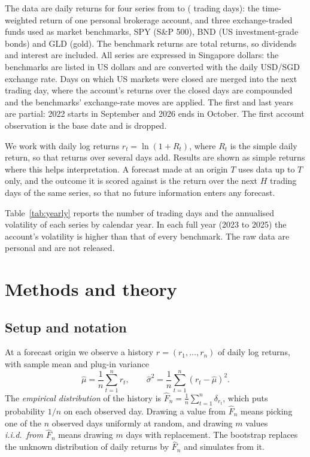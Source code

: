 \documentclass{article}
\newcommand{\muhat}{\hat\mu}
\begin{document}
The data are daily returns for four series from \dataStart{} to \dataEnd{} (\nDays{} trading days):
the time-weighted return of one personal brokerage account, and three exchange-traded funds used as
market benchmarks, SPY (S\&P 500), BND (US investment-grade bonds) and GLD (gold). The benchmark
returns are total returns, so dividends and interest are included. All series are expressed in
Singapore dollars: the benchmarks are listed in US dollars and are converted with the daily USD/SGD
exchange rate. Days on which US markets were closed are merged into the next trading day, where the
account's returns over the closed days are compounded and the benchmarks' exchange-rate moves are
applied. The first and last years are partial: 2022 starts in September and 2026 ends in October.
The first account observation is the base date and is dropped.

We work with daily log returns $r_t=\ln(1+R_t)$, where $R_t$ is the simple daily return, so that
returns over several days add. Results are shown as simple returns where this helps interpretation.
A forecast made at an origin $T$ uses data up to $T$ only, and the outcome it is scored against is
the return over the next $H$ trading days of the same series, so that no future information enters
any forecast.

Table~\ref{tab:yearly} reports the number of trading days and the annualised volatility of each
series by calendar year. In each full year (2023 to 2025) the account's volatility is higher than
that of every benchmark. The raw data are personal and are not released.

\begin{table}[htbp]
  \caption{Trading days and annualised volatility of daily log returns by calendar year. 2022 and
  2026 are partial years.}
  \label{tab:yearly}
  \centering
  \yearlyTable
\end{table}

\section{Methods and theory}\label{sec:methods}

\subsection{Setup and notation}
At a forecast origin we observe a history $r=(r_1,\dots,r_n)$ of daily log returns, with sample mean
and plug-in variance
\[
  \muhat=\frac1n\sum_{t=1}^{n} r_t,\qquad \hat\sigma^2=\frac1n\sum_{t=1}^{n}(r_t-\muhat)^2 .
\]
The \emph{empirical distribution} of the history is $\hat F_n=\frac1n\sum_{t=1}^{n}\delta_{r_t}$,
which puts probability $1/n$ on each observed day. Drawing a value from $\hat F_n$ means picking one
of the $n$ observed days uniformly at random, and drawing $m$ values \emph{i.i.d.\ from $\hat F_n$}
means drawing $m$ days with replacement. The bootstrap replaces the unknown distribution of daily
returns by $\hat F_n$ and simulates from it.
\end{document}
